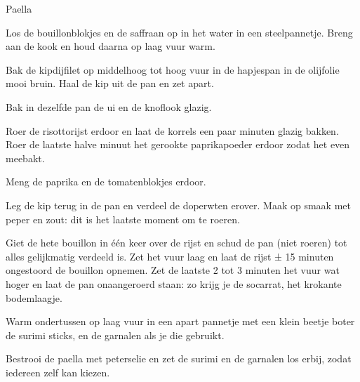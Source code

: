 \begin{recipe}{Paella}
\begin{steps}
  \item Los de bouillonblokjes en de saffraan op in het water in een
        steelpannetje. Breng aan de kook en houd daarna op laag vuur warm.
  \item Bak de kipdijfilet op middelhoog tot hoog vuur in de hapjespan in de
        olijfolie mooi bruin. Haal de kip uit de pan en zet apart.
  \item Bak in dezelfde pan de ui en de knoflook glazig.
  \item Roer de risottorijst erdoor en laat de korrels een paar minuten
        glazig bakken. Roer de laatste halve minuut het gerookte
        paprikapoeder erdoor zodat het even meebakt.
  \item Meng de paprika en de tomatenblokjes erdoor.
  \item Leg de kip terug in de pan en verdeel de doperwten erover. Maak op
        smaak met peper en zout: dit is het laatste moment om te roeren.
  \item Giet de hete bouillon in één keer over de rijst en schud de pan
        (niet roeren) tot alles gelijkmatig verdeeld is. Zet het vuur laag
        en laat de rijst ± 15 minuten ongestoord de bouillon opnemen. Zet de
        laatste 2 tot 3 minuten het vuur wat hoger en laat de pan
        onaangeroerd staan: zo krijg je de socarrat, het krokante
        bodemlaagje.
  \item Warm ondertussen op laag vuur in een apart pannetje met een klein beetje
        boter de surimi sticks, en de garnalen als je die gebruikt.
  \item Bestrooi de paella met peterselie en zet de surimi en de garnalen
        los erbij, zodat iedereen zelf kan kiezen.
\end{steps}

\end{recipe}
